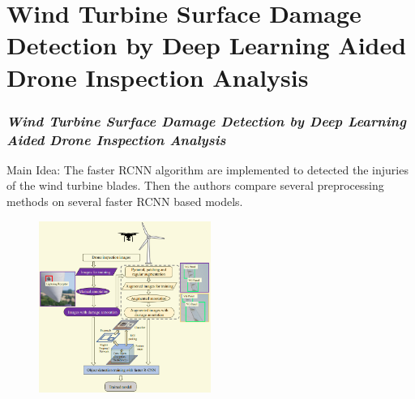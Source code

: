 \section{Wind Turbine Surface Damage Detection by Deep
Learning Aided Drone Inspection Analysis}

\begin{frame}
    \frametitle{\textit{Wind Turbine Surface Damage Detection by Deep
    Learning Aided Drone Inspection Analysis}}

    \begin{block}{Main Idea:}
        The faster RCNN algorithm are implemented to detected the injuries of
        the wind turbine blades. Then the authors compare several preprocessing
        methods on several faster RCNN based models.
    \end{block}
    \begin{figure}[H]
        \centering
        \includegraphics[width=0.5\textwidth]{./imgs/faster_rcnn}
    \end{figure}

\end{frame}
